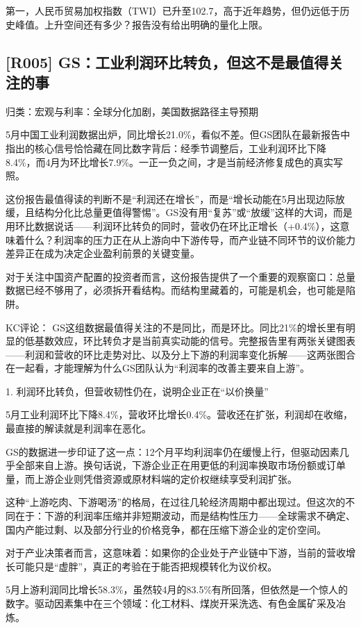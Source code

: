 \documentclass[11pt]{ctexart}
\begin{document}
第一，人民币贸易加权指数（TWI）已升至102.7，高于近年趋势，但仍远低于历史峰值。上升空间还有多少？报告没有给出明确的量化上限。

\subsection{[R005] GS：工业利润环比转负，但这不是最值得关注的事}
{\small\color{refgray}归类：宏观与利率：全球分化加剧，美国数据路径主导预期}

5月中国工业利润数据出炉，同比增长21.0\%，看似不差。但GS团队在最新报告中指出的核心信号恰恰藏在同比数字背后：经季节调整后，工业利润环比下降8.4\%，而4月为环比增长7.9\%。一正一负之间，才是当前经济修复成色的真实写照。

这份报告最值得读的判断不是“利润还在增长”，而是“增长动能在5月出现边际放缓，且结构分化比总量更值得警惕”。GS没有用“复苏”或“放缓”这样的大词，而是用环比数据说话——利润环比转负的同时，营收仍在环比正增长（+0.4\%），这意味着什么？利润率的压力正在从上游向中下游传导，而产业链不同环节的议价能力差异正在成为决定企业盈利前景的关键变量。

对于关注中国资产配置的投资者而言，这份报告提供了一个重要的观察窗口：总量数据已经不够用了，必须拆开看结构。而结构里藏着的，可能是机会，也可能是陷阱。

KC评论： GS这组数据最值得关注的不是同比，而是环比。同比21\%的增长里有明显的低基数效应，环比转负才是当前真实动能的信号。完整报告里有两张关键图表——利润和营收的环比走势对比、以及分上下游的利润率变化拆解——这两张图合在一起看，才能理解为什么GS团队认为“利润率的改善主要来自上游”。

1. 利润环比转负，但营收韧性仍在，说明企业正在“以价换量”

5月工业利润环比下降8.4\%，营收环比增长0.4\%。营收还在扩张，利润却在收缩，最直接的解读就是利润率在恶化。

GS的数据进一步印证了这一点：12个月平均利润率仍在缓慢上行，但驱动因素几乎全部来自上游。换句话说，下游企业正在用更低的利润率换取市场份额或订单量，而上游企业则凭借资源或原材料端的定价权继续享受利润扩张。

这种“上游吃肉、下游喝汤”的格局，在过往几轮经济周期中都出现过。但这次的不同在于：下游的利润率压缩并非短期波动，而是结构性压力——全球需求不确定、国内产能过剩、以及部分行业的价格竞争，都在压缩下游企业的定价空间。

对于产业决策者而言，这意味着：如果你的企业处于产业链中下游，当前的营收增长可能只是“虚胖”，真正的考验在于能否把规模转化为议价权。

5月上游利润同比增长58.3\%，虽然较4月的83.5\%有所回落，但依然是一个惊人的数字。驱动因素集中在三个领域：化工材料、煤炭开采洗选、有色金属矿采及冶炼。
\end{document}
